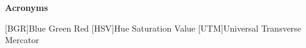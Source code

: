 
\vspace*{0.2cm}
\begin{center}
{\bf \Huge Acronyms}
\end{center}

\begin{acronym}[UTM] %

[BGR]{Blue Green Red}
[HSV]{Hue Saturation Value}
[UTM]{Universal Transverse Mercator}

\end{acronym}




